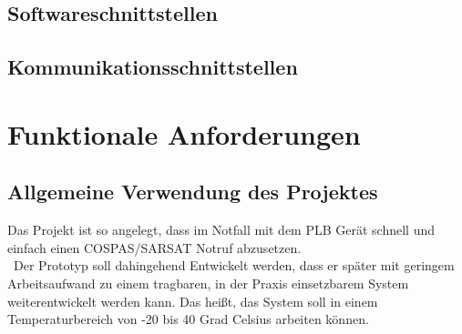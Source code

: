 \subsection{Softwareschnittstellen}

\subsection{Kommunikationsschnittstellen}

\newpage

\section{Funktionale Anforderungen}
\subsection{Allgemeine Verwendung des Projektes}
	Das Projekt ist so angelegt, dass im Notfall mit dem PLB Gerät schnell und einfach einen COSPAS/SARSAT Notruf abzusetzen. \\\
	Der Prototyp soll dahingehend Entwickelt werden, dass er später mit geringem Arbeitsaufwand zu einem tragbaren, in der Praxis einsetzbarem System weiterentwickelt werden kann.
Das heißt, das System soll in einem Temperaturbereich von -20 bis 40 Grad Celsius arbeiten können.
